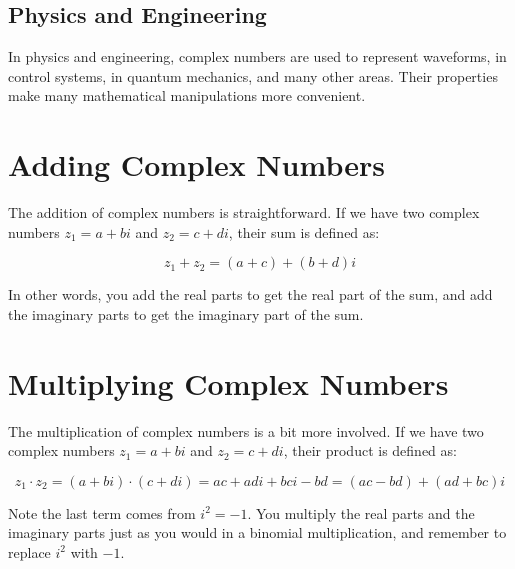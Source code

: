 \subsection{Physics and Engineering}

In physics and engineering, complex numbers are used to represent
waveforms, in control systems, in quantum mechanics, and many other
areas. Their properties make many mathematical manipulations more
convenient.

\section{Adding Complex Numbers}

The addition of complex numbers is straightforward. If we have two
complex numbers $z_1 = a + bi$ and $z_2 = c + di$, their sum is
defined as:

\begin{equation}
z_1 + z_2 = (a + c) + (b + d)i
\end{equation}

In other words, you add the real parts to get the real part of the
sum, and add the imaginary parts to get the imaginary part of the sum.

\section{Multiplying Complex Numbers}

The multiplication of complex numbers is a bit more involved. If we
have two complex numbers $z_1 = a + bi$ and $z_2 = c + di$, their
product is defined as:

\begin{equation}
z_1 \cdot z_2 = (a + bi) \cdot (c + di) = ac + adi + bci - bd = (ac - bd) + (ad + bc)i
\end{equation}

Note the last term comes from $i^2 = -1$. You multiply the real parts
and the imaginary parts just as you would in a binomial
multiplication, and remember to replace $i^2$ with $-1$.

